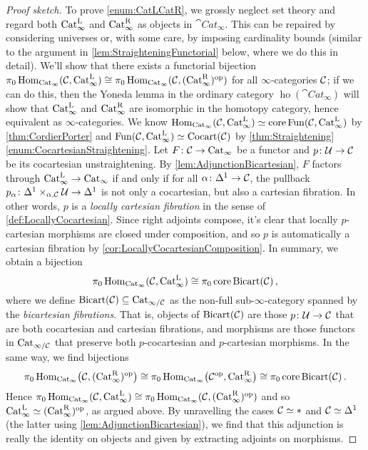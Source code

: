 \begin{proof}[Proof sketch]
	To prove \cref{enum:CatLCatR}, we grossly neglect set theory and regard both $\mathrm{Cat}_\infty^{\mathrm{L}}$ and $\mathrm{Cat}_\infty^{\mathrm{R}}$ as objects in $\cat{Cat}_\infty$. This can be repaired by considering universes or, with some care, by imposing cardinality bounds (similar to the argument in \cref{lem:StraighteningFunctorial} below, where we do this in detail). We'll show that there exists a functorial bijection $\pi_0\operatorname{Hom}_{\mathrm{Cat}_\infty}(\mathcal{C},\mathrm{Cat}_\infty^{\mathrm{L}})\cong \pi_0\operatorname{Hom}_{\mathrm{Cat}_\infty}(\mathcal{C},(\mathrm{Cat}_\infty^{\mathrm{R}})^{\mathrm{op}})$ for all $\infty$-categories $\mathcal{C}$; if we can do this, then the Yoneda lemma in the ordinary category $\operatorname{ho}(\cat{Cat}_\infty)$ will show that $\mathrm{Cat}_\infty^{\mathrm{L}}$ and $\mathrm{Cat}_\infty^{\mathrm{R}}$ are isomorphic in the homotopy category, hence equivalent as $\infty$-categories. We know $\operatorname{Hom}_{\mathrm{Cat}_\infty}(\mathcal{C},\mathrm{Cat}_\infty^{\mathrm{L}})\simeq \operatorname{core}\operatorname{Fun}(\mathcal{C},\mathrm{Cat}_\infty^{\mathrm{L}})$ by \cref{thm:CordierPorter} and $\operatorname{Fun}(\mathcal{C},\mathrm{Cat}_\infty^{\mathrm{L}})\simeq \mathrm{Cocart}(\mathcal{C})$ by \cref{thm:Straightening}\cref{enum:CocartesianStraightening}. Let $F\colon \mathcal{C}\rightarrow \mathrm{Cat}_\infty$ be a functor and $p\colon \mathcal{U}\rightarrow \mathcal{C}$ be its cocartesian unstraightening. By \cref{lem:AdjunctionBicartesian}, $F$ factors through $\mathrm{Cat}_\infty^{\mathrm{L}}\rightarrow \mathrm{Cat}_\infty$ if and only if for all $\alpha\colon\Delta^1\rightarrow \mathcal{C}$, the pullback $p_{\alpha}\colon \Delta^1\times_{\alpha,\mathcal{C}}\mathcal{U}\rightarrow \Delta^1$ is not only a cocartesian, but also a cartesian fibration. In other words, $p$ is a \emph{locally cartesian fibration} in the sense of \cref{def:LocallyCocartesian}. Since right adjoints compose, it's clear that locally $p$-cartesian morphisms are closed under composition, and so $p$ is automatically a cartesian fibration by \cref{cor:LocallyCocartesianComposition}. In summary, we obtain a bijection 
	\begin{equation*}
		\pi_0\operatorname{Hom}_{\mathrm{Cat}_\infty}(\mathcal{C},\mathrm{Cat}_\infty^{\mathrm{L}})\cong \pi_0\operatorname{core}\mathrm{Bicart}(\mathcal{C})\,,
	\end{equation*}
	where we define $\mathrm{Bicart}(\mathcal{C})\subseteq \mathrm{Cat}_{\infty/\mathcal{C}}$ as the non-full sub-$\infty$-category spanned by the \emph{bicartesian fibrations}. That is, objects of $\mathrm{Bicart}(\mathcal{C})$ are those $p\colon \mathcal{U}\rightarrow \mathcal{C}$ that are both cocartesian and cartesian fibrations, and morphisms are those functors in $\mathrm{Cat}_{\infty/\mathcal{C}}$ that preserve both $p$-cocartesian and $p$-cartesian morphisms. In the same way, we find bijections 
	\begin{equation*}
		\pi_0\operatorname{Hom}_{\mathrm{Cat}_\infty}\bigl(\mathcal{C},(\mathrm{Cat}_\infty^{\mathrm{R}})^{\mathrm{op}}\bigr)\cong \pi_0\operatorname{Hom}_{\mathrm{Cat}_\infty}\bigl(\mathcal{C}^{\mathrm{op}},\mathrm{Cat}_\infty^{\mathrm{R}}\bigr)\cong \pi_0\operatorname{core}\mathrm{Bicart}(\mathcal{C})\,.
	\end{equation*}
	Hence $\pi_0\operatorname{Hom}_{\mathrm{Cat}_\infty}(\mathcal{C},\mathrm{Cat}_\infty^{\mathrm{L}})\cong \pi_0\operatorname{Hom}_{\mathrm{Cat}_\infty}(\mathcal{C},(\mathrm{Cat}_\infty^{\mathrm{R}})^{\mathrm{op}})$ and so $\mathrm{Cat}_\infty^{\mathrm{L}}\simeq (\mathrm{Cat}_\infty^{\mathrm{R}})^{\mathrm{op}}$, as argued above. By unravelling the cases $\mathcal{C}\simeq *$ and $\mathcal{C}\simeq \Delta^1$ (the latter using \cref{lem:AdjunctionBicartesian}), we find that this adjunction is really the identity on objects and given by extracting adjoints on morphisms.
\end{proof}

